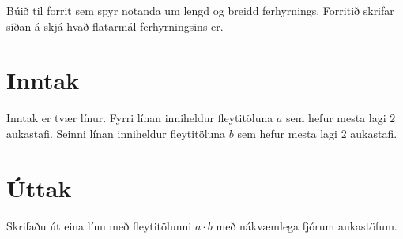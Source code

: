 
Búið til forrit sem spyr notanda um lengd og breidd ferhyrnings. Forritið
skrifar síðan á skjá hvað flatarmál ferhyrningsins er.

\section*{Inntak}
Inntak er tvær línur.
Fyrri línan inniheldur fleytitöluna $a$ sem hefur mesta lagi $2$ aukastafi.
Seinni línan inniheldur fleytitöluna $b$ sem hefur mesta lagi $2$ aukastafi.

\section*{Úttak}
Skrifaðu út eina línu með fleytitölunni $a \cdot b$ með nákvæmlega fjórum aukastöfum.